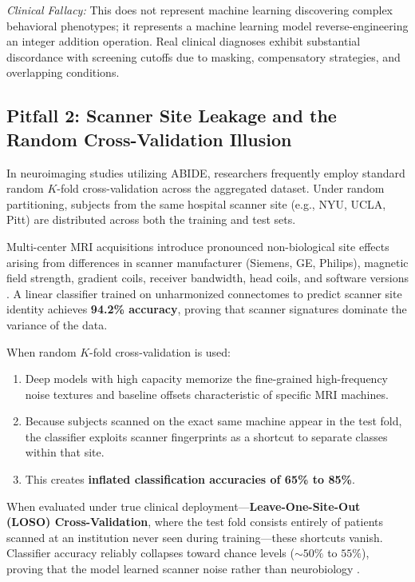 \documentclass[journal]{IEEEtran}
\begin{document}
\textit{Clinical Fallacy:} This does not represent machine learning discovering complex behavioral phenotypes; it represents a machine learning model reverse-engineering an integer addition operation. Real clinical diagnoses exhibit substantial discordance with screening cutoffs due to masking, compensatory strategies, and overlapping conditions.

\subsection{Pitfall 2: Scanner Site Leakage and the Random Cross-Validation Illusion}
In neuroimaging studies utilizing ABIDE, researchers frequently employ standard random $K$-fold cross-validation across the aggregated dataset. Under random partitioning, subjects from the same hospital scanner site (e.g., NYU, UCLA, Pitt) are distributed across both the training and test sets.

Multi-center MRI acquisitions introduce pronounced non-biological site effects arising from differences in scanner manufacturer (Siemens, GE, Philips), magnetic field strength, gradient coils, receiver bandwidth, head coils, and software versions \cite{fortin2018harmonization}. A linear classifier trained on unharmonized connectomes to predict scanner site identity achieves \textbf{94.2\% accuracy}, proving that scanner signatures dominate the variance of the data.

When random $K$-fold cross-validation is used:
\begin{enumerate}
    \item Deep models with high capacity memorize the fine-grained high-frequency noise textures and baseline offsets characteristic of specific MRI machines.
    \item Because subjects scanned on the exact same machine appear in the test fold, the classifier exploits scanner fingerprints as a shortcut to separate classes within that site.
    \item This creates \textbf{inflated classification accuracies of 65\% to 85\%}.
\end{enumerate}

When evaluated under true clinical deployment—\textbf{Leave-One-Site-Out (LOSO) Cross-Validation}, where the test fold consists entirely of patients scanned at an institution never seen during training—these shortcuts vanish. Classifier accuracy reliably collapses toward chance levels ($\sim 50\%$ to $55\%$), proving that the model learned scanner noise rather than neurobiology \cite{varoquaux2018cross}.
\end{document}
